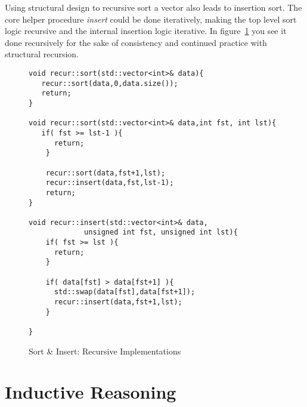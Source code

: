 \documentclass[nobib]{tufte-handout}
\begin{document}
Using structural design to recursive sort a vector also leads to insertion sort.  The core helper procedure \textit{insert} could be done iteratively, making the top level sort logic recursive and the internal insertion logic iterative.  In figure~\ref{code:isortrec} you see it done recursively for the sake of consistency and continued practice with structural recursion.

\begin{figure}
\begin{lstlisting}
void recur::sort(std::vector<int>& data){
   recur::sort(data,0,data.size());
   return;
}

void recur::sort(std::vector<int>& data,int fst, int lst){
   if( fst >= lst-1 ){
      return;
    }

    recur::sort(data,fst+1,lst);
    recur::insert(data,fst,lst-1);
    return;
}

void recur::insert(std::vector<int>& data,
		     unsigned int fst, unsigned int lst){
    if( fst >= lst ){
      return;
    }

    if( data[fst] > data[fst+1] ){
      std::swap(data[fst],data[fst+1]);
      recur::insert(data,fst+1,lst);
    }

}
\end{lstlisting}
\label{code:isortrec}
\caption{Sort \& Insert: Recursive Implementations}
\end{figure}

\section{Inductive Reasoning}
\end{document}
